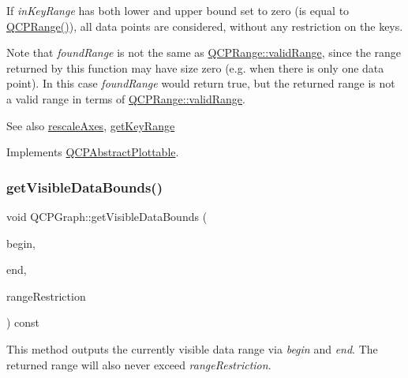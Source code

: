 If {\itshape in\+Key\+Range} has both lower and upper bound set to zero (is equal to {\ttfamily \hyperlink{classQCPRange}{Q\+C\+P\+Range()}}), all data points are considered, without any restriction on the keys.

Note that {\itshape found\+Range} is not the same as \hyperlink{classQCPRange_ab38bd4841c77c7bb86c9eea0f142dcc0}{Q\+C\+P\+Range\+::valid\+Range}, since the range returned by this function may have size zero (e.\+g. when there is only one data point). In this case {\itshape found\+Range} would return true, but the returned range is not a valid range in terms of \hyperlink{classQCPRange_ab38bd4841c77c7bb86c9eea0f142dcc0}{Q\+C\+P\+Range\+::valid\+Range}.

\begin{DoxySeeAlso}{See also}
\hyperlink{classQCPAbstractPlottable_a1491c4a606bccd2d09e65e11b79eb882}{rescale\+Axes}, \hyperlink{classQCPGraph_aac47c6189e3aea46ea46939e5d14796c}{get\+Key\+Range} 
\end{DoxySeeAlso}


Implements \hyperlink{classQCPAbstractPlottable_a4de773988b21ed090fddd27c6a3a3dcb}{Q\+C\+P\+Abstract\+Plottable}.

\mbox{\label{classQCPGraph_a8599447a7f8cbbdcf0b94edcc11df560}} 
\subsubsection{\texorpdfstring{get\+Visible\+Data\+Bounds()}{getVisibleDataBounds()}}
{\footnotesize\ttfamily void Q\+C\+P\+Graph\+::get\+Visible\+Data\+Bounds (\begin{DoxyParamCaption}\item[{Q\+C\+P\+Graph\+Data\+Container\+::const\+\_\+iterator \&}]{begin,  }\item[{Q\+C\+P\+Graph\+Data\+Container\+::const\+\_\+iterator \&}]{end,  }\item[{const \hyperlink{classQCPDataRange}{Q\+C\+P\+Data\+Range} \&}]{range\+Restriction }\end{DoxyParamCaption}) const\hspace{0.3cm}{\ttfamily [protected]}}

This method outputs the currently visible data range via {\itshape begin} and {\itshape end}. The returned range will also never exceed {\itshape range\+Restriction}.

